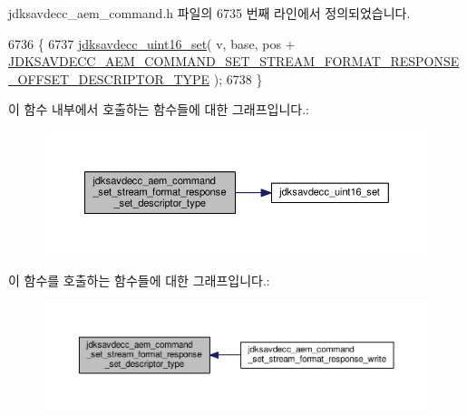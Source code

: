jdksavdecc\+\_\+aem\+\_\+command.\+h 파일의 6735 번째 라인에서 정의되었습니다.


\begin{DoxyCode}
6736 \{
6737     \hyperlink{group__endian_ga14b9eeadc05f94334096c127c955a60b}{jdksavdecc\_uint16\_set}( v, base, pos + 
      \hyperlink{group__command__set__stream__format__response_ga9cdb24efcf82b23e77a55a6feb53cb99}{JDKSAVDECC\_AEM\_COMMAND\_SET\_STREAM\_FORMAT\_RESPONSE\_OFFSET\_DESCRIPTOR\_TYPE}
       );
6738 \}
\end{DoxyCode}


이 함수 내부에서 호출하는 함수들에 대한 그래프입니다.\+:
\nopagebreak
\begin{figure}[H]
\begin{center}
\leavevmode
\includegraphics[width=350pt]{group__command__set__stream__format__response_ga88f065c8ecbabaa62fac78bc2729c1b7_cgraph}
\end{center}
\end{figure}




이 함수를 호출하는 함수들에 대한 그래프입니다.\+:
\nopagebreak
\begin{figure}[H]
\begin{center}
\leavevmode
\includegraphics[width=350pt]{group__command__set__stream__format__response_ga88f065c8ecbabaa62fac78bc2729c1b7_icgraph}
\end{center}
\end{figure}


